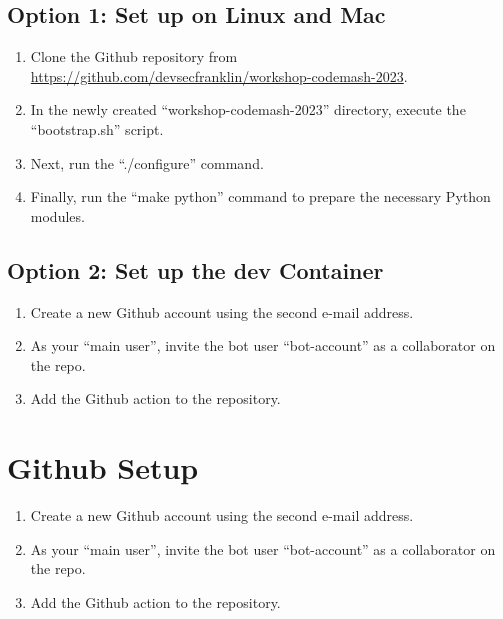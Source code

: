 \subsection{\label{sec:dev-linux}Option 1: Set up on Linux and Mac}

\justifying
\begin{raggedright}
    \begin{enumerate}
        \item Clone the Github repository from \href{https://github.com/devsecfranklin/workshop-codemash-2023}{https://github.com/devsecfranklin/workshop-codemash-2023}.
        \item In the newly created ``workshop-codemash-2023'' directory, execute the ``bootstrap.sh'' script.
        \item Next, run the ``./configure'' command.
        \item Finally, run the ``make python'' command to prepare the necessary Python modules.
    \end{enumerate}
\end{raggedright}
\vspace{2mm}

\subsection{\label{sec:dev-container}Option 2: Set up the dev Container}

\justifying
\begin{raggedright}
    \begin{enumerate}
        \item Create a new Github account using the second e-mail address.
        \item As your ``main user'', invite the bot user ``bot-account'' as a collaborator on the repo.
        \item Add the Github action to the repository.
    \end{enumerate}
\end{raggedright}
\vspace{2mm}

\section{\label{sec:github}Github Setup}


\justifying
\begin{raggedright}
	\begin{enumerate}
		\item Create a new Github account using the second e-mail address.
		\item As your ``main user'', invite the bot user ``bot-account'' as a collaborator on the repo.
		\item Add the Github action to the repository.
	\end{enumerate}
\end{raggedright}
\vspace{2mm}

